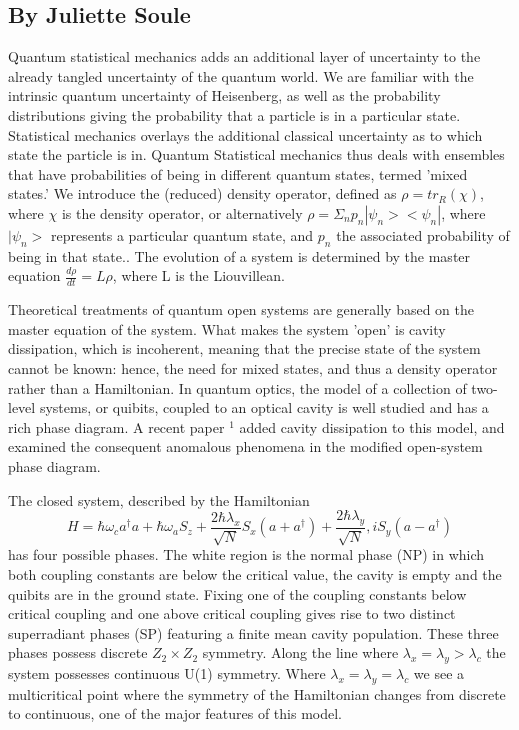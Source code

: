 \subsection{By Juliette Soule}

Quantum statistical mechanics adds an additional layer of uncertainty to the already tangled uncertainty of the quantum world. We are familiar with the intrinsic quantum uncertainty of Heisenberg, as well as the probability distributions giving the probability that a particle is in a particular state. Statistical mechanics overlays the additional classical uncertainty as to which state the particle is in. Quantum Statistical mechanics thus deals with ensembles that have probabilities of being in different quantum states, termed 'mixed states.' We introduce the (reduced) density operator, defined as $\rho = tr_{R}(\chi)$, where $\chi$ is the density operator, or alternatively $\rho= \Sigma_{n}p_{n}|\psi_{n}><\psi_{n}|$, where $|\psi_{n}>$ represents a particular quantum state, and $p_{n}$ the associated probability of being in that state.. The evolution of a system is determined by the master equation $\frac{d\rho}{d t} = L\rho$, where L is the Liouvillean. 

Theoretical treatments of quantum open systems are generally based on the master equation of the system. What makes the system 'open' is cavity dissipation, which is incoherent, meaning that the precise state of the system cannot be known: hence, the need for mixed states, and thus a density operator rather than a Hamiltonian. In quantum optics, the model of a collection of two-level systems, or quibits, coupled to an optical cavity is well studied and has a rich phase diagram. A recent paper $^{1}$ added cavity dissipation to this model, and examined the consequent anomalous phenomena in the modified open-system phase diagram. 

The closed system, described by the Hamiltonian 
\begin{equation}
H = \hbar\omega_{c}a^{\dagger}a+\hbar\omega_{a}S_{z}+\frac{2\hbar\lambda_{x}}{\sqrt{N}}S_{x}(a+a^{\dagger})+\frac{2\hbar\lambda_{y}}{\sqrt{N}},iS_{y}(a-a^{\dagger})
\end{equation}
 has four possible phases. The white region is the normal phase (NP) in which both coupling constants are below the critical value, the cavity is empty and the quibits are in the ground state. Fixing one of the coupling constants below critical coupling and one above critical coupling gives rise to two distinct superradiant phases (SP) featuring a finite mean cavity population. These three phases possess discrete $Z_{2}\times Z_{2}$ symmetry. Along the line where $\lambda_{x}=\lambda_{y}>\lambda_{c}$ the system possesses continuous U(1) symmetry. Where $\lambda_{x}=\lambda_{y}=\lambda_{c}$ we see a multicritical point where the symmetry of the Hamiltonian changes from discrete to continuous, one of the major features of this model.
 
